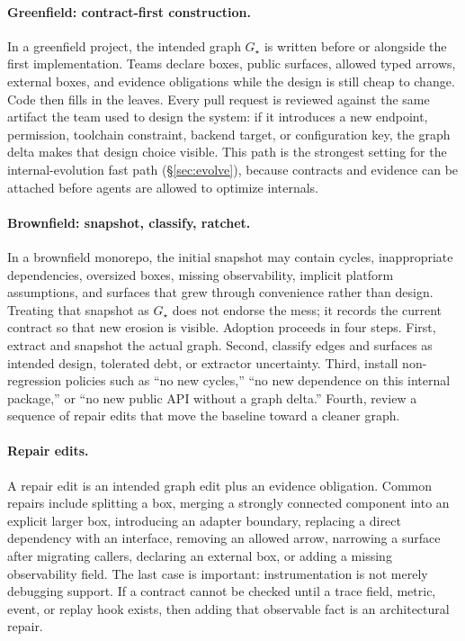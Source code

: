 \documentclass[sigconf,review,anonymous]{acmart}
\theoremstyle{plain}
\theoremstyle{definition}
\begin{document}
\paragraph{Greenfield: contract-first construction.}
In a greenfield project, the intended graph $G_\star$ is written before or
alongside the first implementation. Teams declare boxes, public surfaces,
allowed typed arrows, external boxes, and evidence obligations while the design
is still cheap to change. Code then fills in the leaves. Every pull request is
reviewed against the same artifact the team used to design the system: if it
introduces a new endpoint, permission, toolchain constraint, backend target, or
configuration key, the graph delta makes that design choice visible. This path
is the strongest setting for the internal-evolution fast path
(\S\ref{sec:evolve}), because contracts and evidence can be attached before
agents are allowed to optimize internals.

\paragraph{Brownfield: snapshot, classify, ratchet.}
In a brownfield monorepo, the initial snapshot may contain cycles,
inappropriate dependencies, oversized boxes, missing observability, implicit
platform assumptions, and surfaces that grew through convenience rather than
design. Treating that snapshot as $G_\star$ does not endorse the mess; it
records the current contract so that new erosion is visible. Adoption proceeds
in four steps. First, extract and snapshot the actual graph. Second, classify
edges and surfaces as intended design, tolerated debt, or extractor uncertainty.
Third, install non-regression policies such as ``no new cycles,'' ``no new
dependence on this internal package,'' or ``no new public API without a graph
delta.'' Fourth, review a sequence of repair edits that move the baseline
toward a cleaner graph.

\paragraph{Repair edits.}
A repair edit is an intended graph edit plus an evidence obligation. Common
repairs include splitting a box, merging a strongly connected component into an
explicit larger box, introducing an adapter boundary, replacing a direct
dependency with an interface, removing an allowed arrow, narrowing a surface
after migrating callers, declaring an external box, or adding a missing
observability field. The last case is important: instrumentation is not merely
debugging support. If a contract cannot be checked until a trace field, metric,
event, or replay hook exists, then adding that observable fact is an
architectural repair.
\end{document}
